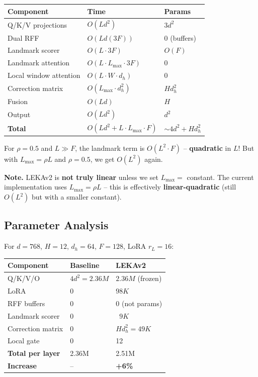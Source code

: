 \begin{table}[H]
\centering
\small
\begin{tabular}{lll}
\toprule
\textbf{Component} & \textbf{Time} & \textbf{Params} \\
\midrule
Q/K/V projections & $O(L d^2)$ & $3 d^2$ \\
Dual RFF & $O(L d (3F))$ & 0 (buffers) \\
Landmark scorer & $O(L \cdot 3F)$ & $O(F)$ \\
Landmark attention & $O(L \cdot L_\text{max} \cdot 3F)$ & 0 \\
Local window attention & $O(L \cdot W \cdot d_h)$ & 0 \\
Correction matrix & $O(L_\text{max} \cdot d_h^2)$ & $H d_h^2$ \\
Fusion & $O(L d)$ & $H$ \\
Output & $O(L d^2)$ & $d^2$ \\
\textbf{Total} & $O(L d^2 + L \cdot L_\text{max} \cdot F)$ & $\sim 4 d^2 + H d_h^2$ \\
\bottomrule
\end{tabular}
\end{table}

For $\rho = 0.5$ and $L \gg F$, the landmark term is 
$O(L^2 \cdot F)$ -- \textbf{quadratic} in $L$! But with $L_\text{max} = \rho L$ 
and $\rho = 0.5$, we get $O(L^2)$ again.

\textbf{Note.} LEKAv2 is \textbf{not truly linear} unless we set $L_\text{max} = $ 
constant. The current implementation uses $L_\text{max} = \rho L$ -- this 
is effectively \textbf{linear-quadratic} (still $O(L^2)$ but with a smaller 
constant).

\subsection{Parameter Analysis}

For $d = 768$, $H = 12$, $d_h = 64$, $F = 128$, LoRA $r_L = 16$:

\begin{table}[H]
\centering
\small
\begin{tabular}{lll}
\toprule
\textbf{Component} & \textbf{Baseline} & \textbf{LEKAv2} \\
\midrule
Q/K/V/O & $4 d^2 = 2.36M$ & $2.36M$ (frozen) \\
LoRA & 0 & $98K$ \\
RFF buffers & 0 & 0 (not params) \\
Landmark scorer & 0 & ~$9K$ \\
Correction matrix & 0 & $H d_h^2 = 49K$ \\
Local gate & 0 & 12 \\
\textbf{Total per layer} & 2.36M & 2.51M \\
\textbf{Increase} & -- & \textbf{+6\%} \\
\bottomrule
\end{tabular}
\end{table}

